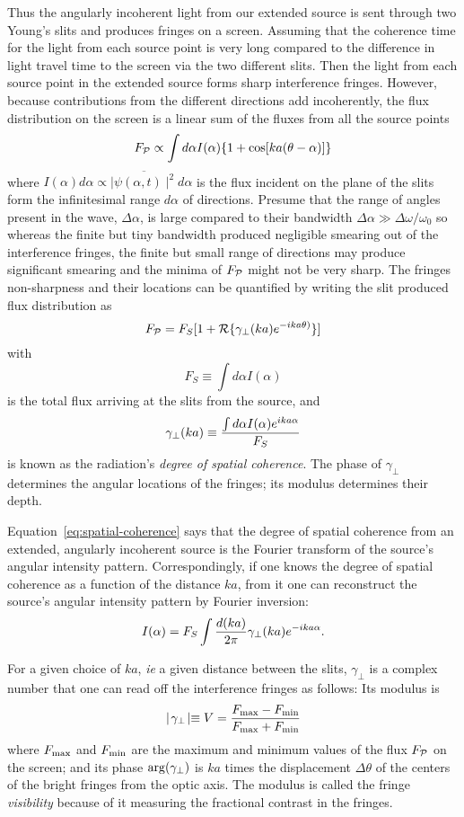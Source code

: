 \documentclass{article}
\newcommand{\be}{\begin{equation}}
\newcommand{\ee}{\end{equation}}
\def\cl#1{{\cal #1}}               %
\def\labs{\mid\!}
\def\rabs{\!\mid}
\begin{document}
Thus the angularly incoherent light from our extended source is sent through two Young's slits and produces fringes on a screen. Assuming that the coherence time for the
light from each source point is very long compared to the difference in light travel time
 to the screen via the two different slits. Then the light from each source point in the 
extended source forms sharp interference fringes. However, because contributions from the different directions add incoherently, the flux distribution on the screen is a linear sum of the fluxes from all the source points
\[
F_{\cl{P}}\propto\int d\alpha I(\alpha)\{1+\cos[ka(\theta-\alpha)]\}
\]
where $I(\alpha)d\alpha\propto\overline{\labs\psi(\alpha,t)\rabs^2}d\alpha$ is the flux incident on the plane of the slits form the infinitesimal range $d\alpha$ of directions. Presume that the range of angles present in the wave, $\Delta\alpha$, is large compared to their bandwidth $\Delta\alpha\gg{\Delta\omega/\omega_0}$ so whereas the finite but tiny bandwidth produced negligible smearing out of the interference fringes, the finite but small range of directions may produce significant smearing and the minima of $F_{\cl{P}}$ might not be very sharp. The fringes non-sharpness and their locations can be quantified by writing the slit produced flux distribution as
\[
F_{\cl{P}}=F_S[1+\cl{R}\{\gamma_\perp(ka)e^{-ika\theta)}\}]
\]
with
\[
F_S\equiv\int d\alpha I(\alpha)
\]
is the total flux arriving at the slits from the source, and 
\be
\gamma_\perp(ka)\equiv{\int d\alpha I(\alpha)e^{ika\alpha}\over F_S}
\label{eq:spatial-coherence}
\ee
is known as the radiation's {\it degree of spatial coherence}. The phase of $\gamma_\perp$ determines the angular locations of the fringes; its modulus determines their depth. 

Equation~\ref{eq:spatial-coherence} says that the degree of spatial coherence from an extended, angularly incoherent source is the Fourier transform of the source's angular intensity pattern. Correspondingly, if one knows the degree of spatial coherence as a function of the distance $ka$, from it one can reconstruct the source's angular intensity pattern by Fourier inversion:
\be
I(\alpha)=F_S\int{d(ka)\over 2\pi}\gamma_\perp(ka)e^{-ika\alpha}.
\label{eq:fourier-coherence}
\ee

For a given choice of $ka$, {\it ie} a given distance between the slits, $\gamma_\perp$ is a complex number that one can read off the interference fringes as follows: Its modulus is 
\[
\labs\gamma_\perp\rabs\equiv V={F_{\rm max}-F_{\rm min}\over F_{\rm max}+F_{\rm min}}
\]
where $F_{\rm max}$ and $F_{\rm min}$ are the maximum and minimum values of the flux $F_{\cl P}$ on the screen; and its phase ${\rm arg}(\gamma_\perp)$ is $ka$ times the displacement $\Delta\theta$ of the centers of the bright fringes from the optic axis. The modulus is called the fringe {\it visibility} because of it measuring the fractional contrast in the fringes. 
\end{document}
